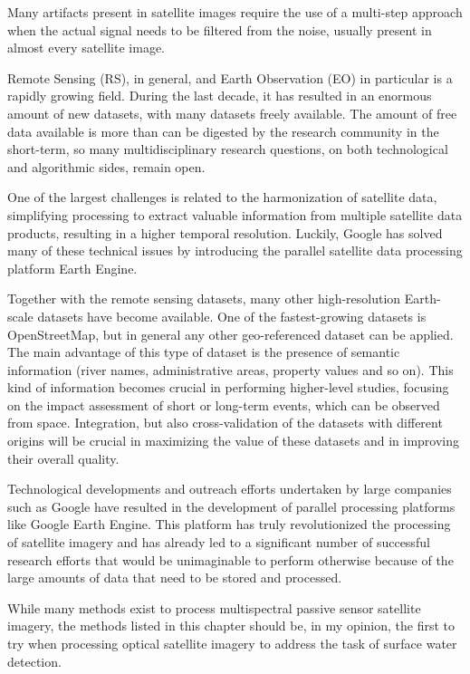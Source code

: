 Many artifacts present in satellite images require the use of a multi-step approach when the actual signal needs to be filtered from the noise, usually present in almost every satellite image.

Remote Sensing (RS), in general, and Earth Observation (EO) in particular is a rapidly growing field. During the last decade, it has resulted in an enormous amount of new datasets, with many datasets freely available. The amount of free data available is more than can be digested by the research community in the short-term, so many multidisciplinary research questions, on both technological and algorithmic sides, remain open.

One of the largest challenges is related to the harmonization of satellite data, simplifying processing to extract valuable information from multiple satellite data products, resulting in a higher temporal resolution. Luckily, Google has solved many of these technical issues by introducing the parallel satellite data processing platform Earth Engine. 

Together with the remote sensing datasets, many other high-resolution Earth-scale datasets have become available. One of the fastest-growing datasets is OpenStreetMap, but in general any other geo-referenced dataset can be applied. The main advantage of this type of dataset is the presence of semantic information (river names, administrative areas, property values and so on). This kind of information becomes crucial in performing higher-level studies, focusing on the impact assessment of short or long-term events, which can be observed from space. Integration, but also cross-validation of the datasets with different origins will be crucial in maximizing the value of these datasets and in improving their overall quality.

Technological developments and outreach efforts undertaken by large companies such as Google have resulted in the development of parallel processing platforms like Google Earth Engine. This platform has truly revolutionized the processing of satellite imagery and has already led to a significant number of successful research efforts that would be unimaginable to perform otherwise because of the large amounts of data that need to be stored and processed.

While many methods exist to process multispectral passive sensor satellite imagery, the methods listed in this chapter should be, in my opinion, the first to try when processing optical satellite imagery to address the task of surface water detection.

